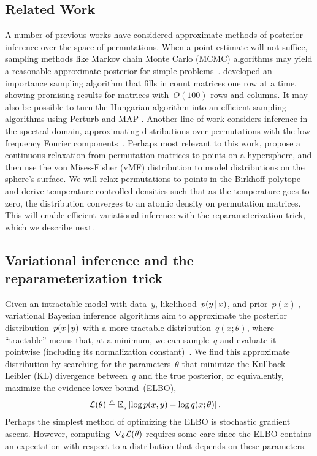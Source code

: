 \documentclass[twoside]{article}
\begin{document}
\subsection{Related Work}
A number of previous works have considered approximate methods of
posterior inference over the space of permutations.
When a point estimate will not suffice, sampling methods like Markov
chain Monte Carlo (MCMC) algorithms may yield a reasonable approximate
posterior for simple problems~\citep{diaconis1988group}.
\citet{harrison2013importance} developed an importance sampling
algorithm that fills in count matrices one row at a time, showing
promising results for matrices with~$O(100)$ rows and columns.  It may
also be possible to turn the Hungarian algorithm into an efficient
sampling algorithms using Perturb-and-MAP \citep{li2013efficient}.
Another line of work considers inference in the spectral domain,
approximating distributions over permutations with the low frequency
Fourier components~\citep{kondor2007multi, huang2009fourier}.  Perhaps
most relevant to this work, \citet{plis2011directional} propose a
continuous relaxation from permutation matrices to points on a
hypersphere, and then use the von Mises-Fisher (vMF) distribution to
model distributions on the sphere's surface.  
We will relax permutations to points in the Birkhoff polytope and
derive temperature-controlled densities such that as the
temperature goes to zero, the distribution converges to an atomic
density on permutation matrices.  This will enable efficient variational
inference with the reparameterization trick, which we describe next. 



\subsection{Variational inference and the reparameterization trick}
\label{sub:repa}
Given an intractable model with data~$y$, likelihood~$p(y \, | \, x)$,
and prior~$p(x)~$, variational Bayesian inference algorithms aim to
approximate the posterior distribution~$p(x \, | \, y)$ with a more
tractable distribution~$q(x; \theta)$, where ``tractable'' means that,
at a minimum, we can sample~$q$ and evaluate it pointwise (including
its normalization constant)~\citep{Blei2017}.  We find this
approximate distribution by searching for the parameters~$\theta$ that
minimize the Kullback-Leibler (KL) divergence between~$q$ and the true
posterior, or equivalently, maximize the evidence lower bound~(ELBO),
\begin{align*}
  \mathcal{L}(\theta) &\triangleq \mathbb{E}_q \left[ \log p(x, y) - \log q(x; \theta) \right].
\end{align*}
Perhaps the simplest method of optimizing the ELBO is stochastic
gradient ascent.  However, computing~$\nabla_\theta \mathcal{L}(\theta)$
requires some care since the ELBO contains an expectation with respect
to a distribution that depends on these parameters.
\end{document}
